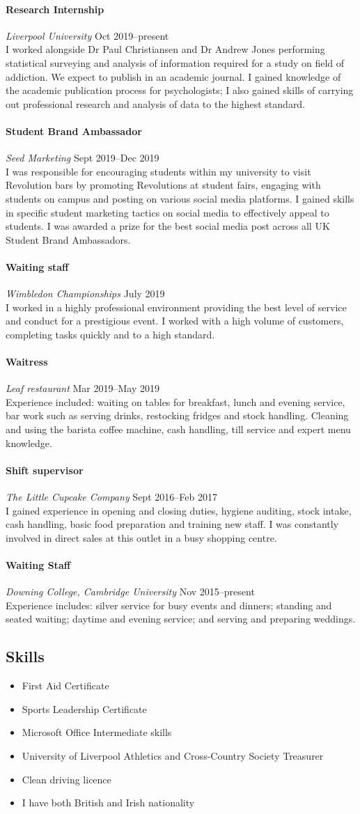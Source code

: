 \documentclass[11pt,a4paper]{article}
\newcommand{\centry}[3]{\paragraph{#1} \textit{#2}%
\hfill#3\\[2pt]}
\begin{document}
\centry{Research Internship}{Liverpool University}{Oct 2019--present}

I worked alongside Dr Paul Christiansen and Dr Andrew Jones performing
statistical surveying and analysis of information required for a study on field
of addiction. We expect to publish in an academic journal. I gained knowledge
of the academic publication process for psychologists; I also gained skills of
carrying out professional research and analysis of data to the highest
standard.

\centry{Student Brand Ambassador}{Seed Marketing}{Sept 2019--Dec 2019}

I was responsible for encouraging students within my university to visit
Revolution bars by promoting Revolutions at student fairs, engaging with
students on campus and posting on various social media platforms.  I gained
skills in specific student marketing tactics on social media to effectively
appeal to students. I was awarded a prize for the best social media post across
all UK Student Brand Ambassadors.

\centry{Waiting staff}{Wimbledon Championships}{July 2019}

I worked in a highly professional environment providing the best level of
service and conduct for a prestigious event. I worked with a high volume of
customers, completing tasks quickly and to a high standard.

\centry{Waitress}{Leaf restaurant}{Mar 2019--May 2019}

Experience included: waiting on tables for breakfast, lunch and evening
service, bar work such as serving drinks, restocking fridges and stock
handling. Cleaning and using the barista coffee machine, cash handling, till
service and expert menu knowledge.

\centry{Shift supervisor}{The Little Cupcake Company}{Sept 2016--Feb 2017}

I gained experience in opening and closing duties, hygiene auditing, stock
intake, cash handling, basic food preparation and training new staff. I was
constantly involved in direct sales at this outlet in a busy shopping centre.

\centry{Waiting Staff}{Downing College, Cambridge University}{Nov
  2015--present}

Experience includes: silver service for busy events and dinners; standing and
seated waiting; daytime and evening service; and serving and preparing
weddings.


\subsection*{Skills}
\begin{itemize}[noitemsep]
  \item First Aid Certificate
  \item Sports Leadership Certificate 
  \item Microsoft Office Intermediate skills
  \item University of Liverpool Athletics and Cross-Country Society Treasurer
  \item Clean driving licence 
  \item I have both British and Irish nationality 
\end{itemize}
\end{document}
